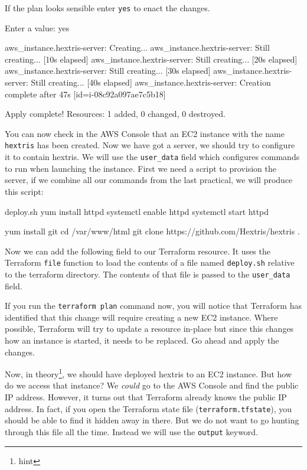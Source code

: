 \documentclass{csse4400}
\begin{document}
If the plan looks sensible enter \texttt{yes} to enact the changes.

\begin{code}[language=terraform-plan]{}
  Enter a value: yes

aws_instance.hextris-server: Creating...
aws_instance.hextris-server: Still creating... [10s elapsed]
aws_instance.hextris-server: Still creating... [20s elapsed]
aws_instance.hextris-server: Still creating... [30s elapsed]
aws_instance.hextris-server: Still creating... [40s elapsed]
aws_instance.hextris-server: Creation complete after 47s [id=i-08c92a097ae7c5b18]

Apply complete! Resources: 1 added, 0 changed, 0 destroyed.
\end{code}

You can now check in the AWS Console that an EC2 instance with the name \texttt{hextris} has been created.
Now we have got a server, we should try to configure it to contain hextris.
We will use the \texttt{user\_data} field which configures commands to run when launching the instance.
First we need a script to provision the server, if we combine all our commands from the last practical, we will produce this script:

\begin{code}[language=bash]{deploy.sh}
yum install httpd
systemctl enable httpd
systemctl start httpd

yum install git
cd /var/www/html
git clone https://github.com/Hextris/hextris .  
\end{code}

Now we can add the following field to our Terraform resource.
It uses the Terraform \texttt{file} function to load the contents of a file named \texttt{deploy.sh} relative to the terraform directory.
The contents of that file is passed to the \texttt{user\_data} field.


If you run the \texttt{terraform plan} command now,
you will notice that Terraform has identified that this change will require creating a new EC2 instance.
Where possible, Terraform will try to update a resource in-place but since this changes how an instance is started, it needs to be replaced.
Go ahead and apply the changes.

Now, in theory\footnote{hint}, we should have deployed hextris to an EC2 instance.
But how do we access that instance?
We \textsl{could} go to the AWS Console and find the public IP address.
However, it turns out that Terraform already knows the public IP address.
In fact, if you open the Terraform state file (\texttt{terraform.tfstate}),
you should be able to find it hidden away in there.
But we do not want to go hunting through this file all the time.
Instead we will use the \texttt{output} keyword.
\end{document}
